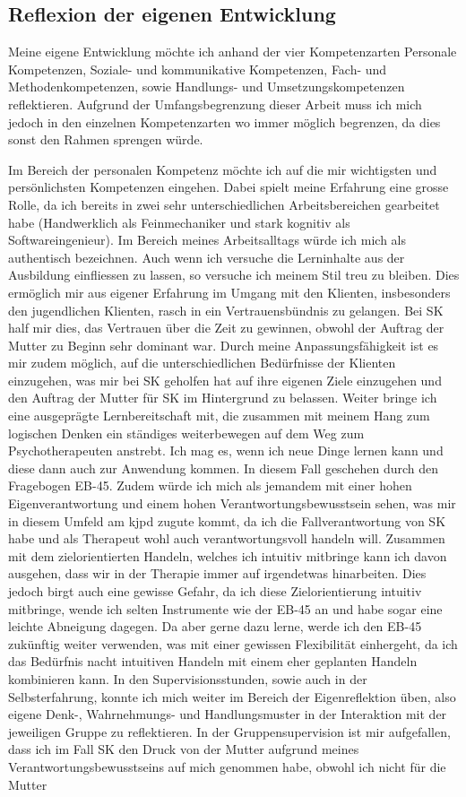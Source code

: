 \subsection{Reflexion der eigenen Entwicklung} \label{sec:reflexionEntwicklung}
Meine eigene Entwicklung möchte ich anhand der vier Kompetenzarten Personale Kompetenzen, Soziale- und kommunikative Kompetenzen, Fach- und Methodenkompetenzen, sowie Handlungs- und Umsetzungskompetenzen reflektieren. Aufgrund der Umfangsbegrenzung dieser Arbeit muss ich mich jedoch in den einzelnen Kompetenzarten wo immer möglich begrenzen, da dies sonst den Rahmen sprengen würde.

Im Bereich der personalen Kompetenz möchte ich auf die mir wichtigsten und persönlichsten Kompetenzen eingehen. Dabei spielt meine Erfahrung eine grosse Rolle, da ich bereits in zwei sehr unterschiedlichen Arbeitsbereichen gearbeitet habe (Handwerklich als Feinmechaniker und stark kognitiv als Softwareingenieur). Im Bereich meines Arbeitsalltags würde ich mich als authentisch bezeichnen. Auch wenn ich versuche die Lerninhalte aus der Ausbildung einfliessen zu lassen, so versuche ich meinem Stil treu zu bleiben. Dies ermöglich mir aus eigener Erfahrung im Umgang mit den Klienten, insbesonders den jugendlichen Klienten, rasch in ein Vertrauensbündnis zu gelangen. Bei SK half mir dies, das Vertrauen über die Zeit zu gewinnen, obwohl der Auftrag der Mutter zu Beginn sehr dominant war. Durch meine Anpassungsfähigkeit ist es mir zudem möglich, auf die unterschiedlichen Bedürfnisse der Klienten einzugehen, was mir bei SK geholfen hat auf ihre eigenen Ziele einzugehen und den Auftrag der Mutter für SK im Hintergrund zu belassen. Weiter bringe ich eine ausgeprägte Lernbereitschaft mit, die zusammen mit meinem Hang zum logischen Denken ein ständiges weiterbewegen auf dem Weg zum Psychotherapeuten anstrebt. Ich mag es, wenn ich neue Dinge lernen kann und diese dann auch zur Anwendung kommen. In diesem Fall geschehen durch den Fragebogen EB-45. Zudem würde ich mich als jemandem mit einer hohen Eigenverantwortung und einem hohen Verantwortungsbewusstsein sehen, was mir in diesem Umfeld am \ac{kjpd} zugute kommt, da ich die Fallverantwortung von SK habe und als Therapeut wohl auch verantwortungsvoll handeln will. Zusammen mit dem zielorientierten Handeln, welches ich intuitiv mitbringe kann ich davon ausgehen, dass wir in der Therapie immer auf irgendetwas hinarbeiten. Dies jedoch birgt auch eine gewisse Gefahr, da ich diese Zielorientierung intuitiv mitbringe, wende ich selten Instrumente wie der EB-45 an und habe sogar eine leichte Abneigung dagegen. Da aber gerne dazu lerne, werde ich den EB-45 zukünftig weiter verwenden, was mit einer gewissen Flexibilität einhergeht, da ich das Bedürfnis nacht intuitiven Handeln mit einem eher geplanten Handeln kombinieren kann. In den Supervisionsstunden, sowie auch in der Selbsterfahrung, konnte ich mich weiter im Bereich der Eigenreflektion üben, also eigene Denk-, Wahrnehmungs- und Handlungsmuster in der Interaktion mit der jeweiligen Gruppe zu reflektieren. In der Gruppensupervision ist mir aufgefallen, dass ich im Fall SK den Druck von der Mutter aufgrund meines Verantwortungsbewusstseins auf mich genommen habe, obwohl ich nicht für die Mutter 